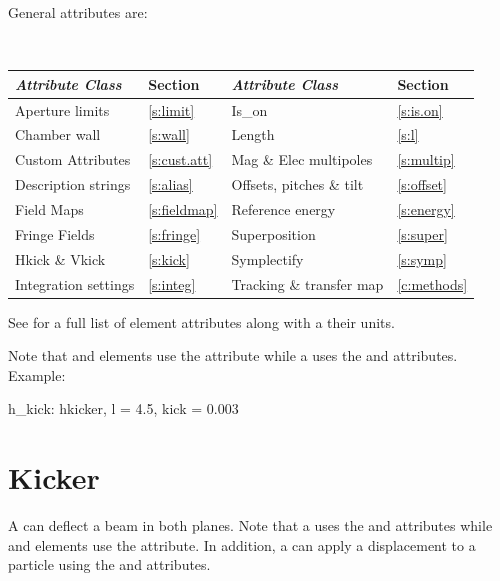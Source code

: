 General   attributes are:
\begin{center}
\tt
\begin{tabular}{llll} \toprule
  {\sl Attribute Class}      & Section           & {\sl Attribute Class}      & Section         \\ \midrule
  Aperture limits            & \ref{s:limit}     & Is_on                      & \ref{s:is.on}   \\
  Chamber wall               & \ref{s:wall}      & Length                     & \ref{s:l}       \\
  Custom Attributes          & \ref{s:cust.att}  & Mag \& Elec multipoles     & \ref{s:multip}  \\
  Description strings        & \ref{s:alias}     & Offsets, pitches \& tilt   & \ref{s:offset}  \\
  Field Maps                 & \ref{s:fieldmap}  & Reference energy           & \ref{s:energy}  \\ 
  Fringe Fields              & \ref{s:fringe}    & Superposition              & \ref{s:super}   \\
  Hkick \& Vkick             & \ref{s:kick}      & Symplectify                & \ref{s:symp}    \\
  Integration settings       & \ref{s:integ}     & Tracking \& transfer map   & \ref{c:methods} \\
  \bottomrule
\end{tabular}
\end{center}
\toffset
See  for a full list of element attributes along with a their units.

Note that  and  elements use the
 attribute while a  uses the  and  
attributes. Example:
\begin{example}
  h_kick: hkicker, l = 4.5, kick = 0.003
\end{example}

\newpage

\section{Kicker}
\label{s:kicker}

A  can deflect a beam in both planes. Note that a  uses the  and
 attributes while  and  elements use the  attribute.  In
addition, a  can apply a displacement to a particle using the  and
 attributes.

